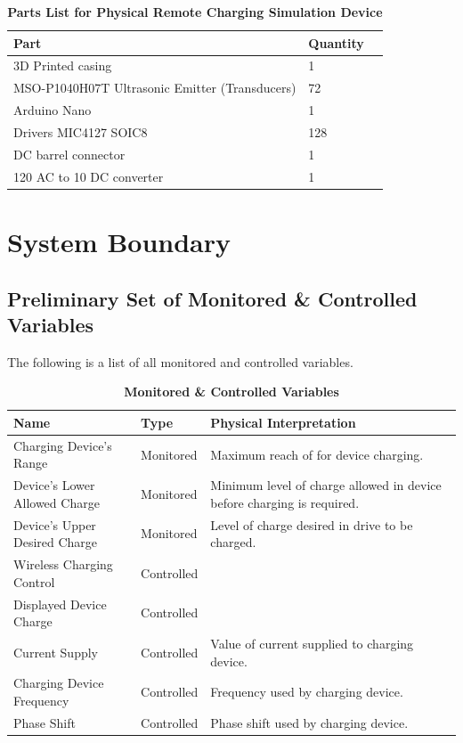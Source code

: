 \documentclass[12pt, titlepage]{article}
\begin{document}
\begin{table}[H]
  \caption{\bf Parts List for Physical Remote Charging Simulation Device}
  \begin{tabular}{ |p{4cm}|p{3cm}|p{7cm}|} 
   \hline
  \bf Part & \bf Quantity\\
   \hline
   3D Printed casing & 1\\
   \hline
   MSO-P1040H07T Ultrasonic Emitter (Transducers) & 72\\
   \hline 
   Arduino Nano & 1\\
   \hline 
   Drivers MIC4127 SOIC8 & 128\\
   \hline 
   \hline 
   DC barrel connector & 1\\
   \hline 
   120 AC to 10 DC converter & 1\\
   \hline 
  \end{tabular}
  \end{table}

\section{System Boundary}
\subsection{Preliminary Set of Monitored \& Controlled Variables}
The following is a list of all monitored and controlled variables.
\begin{table}[htp]
\caption{\bf Monitored \& Controlled Variables}
    \begin{tabular}{|p{4cm}|p{3cm}|p{7cm}|}
         \hline
         \bf Name & \bf Type & \bf Physical Interpretation\\
         \hline
         Charging Device's Range & Monitored & Maximum reach of for device charging.\\
         \hline
         Device's Lower Allowed Charge & Monitored & Minimum level of charge allowed in device before charging is required.\\
         \hline
         Device's Upper Desired Charge & Monitored & Level of charge desired in drive to be charged.\\
         \hline
         Wireless Charging Control & Controlled & \\
         \hline
         Displayed Device Charge & Controlled & \\
         \hline
         Current Supply & Controlled & Value of current supplied to charging device.\\
         \hline
         Charging Device Frequency & Controlled & Frequency used by charging device.\\
         \hline
         Phase Shift & Controlled & Phase shift used by charging device.\\
         \hline
    \end{tabular}
\end{table}
\end{document}
